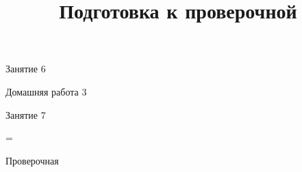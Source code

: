 \begin{class}[number=6]
	\begin{listofex}
		\item Занятие 6
	\end{listofex}
\end{class}

\begin{homework}[number=3]
	\begin{listofex}
		\item Домашняя работа 3
	\end{listofex}
\end{homework}

\begin{class}[number=7]
	\title{Подготовка к проверочной}
	\begin{listofex}
		\item Занятие 7
	\end{listofex}
\end{class}

=%
\begin{exam}
	\begin{listofex}
		\item Проверочная
	\end{listofex}
\end{exam}
